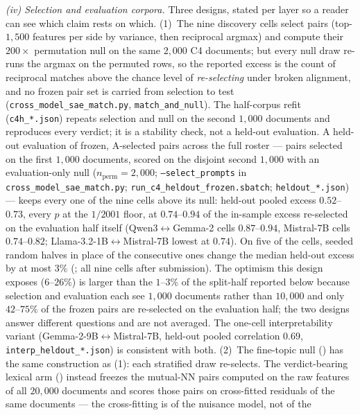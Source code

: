 \emph{(iv) Selection and evaluation corpora.} Three designs, stated per layer so a reader
can see which claim rests on which. (1)~The nine discovery cells select pairs (top-$1{,}500$
features per side by variance, then reciprocal argmax) and compute their $200\times$
permutation null on the same $2{,}000$ C4 documents; but every null draw re-runs the argmax
on the permuted rows, so the reported excess is the count of reciprocal matches above the
chance level of \emph{re-selecting} under broken alignment, and no frozen pair set is
carried from selection to test (\texttt{cross\_model\_sae\_match.py},
\texttt{match\_and\_null}). The half-corpus refit (\texttt{c4h\_*.json}) repeats selection
and null on the second $1{,}000$ documents and reproduces every verdict; it is a stability
check, not a held-out evaluation. A held-out evaluation of frozen, A-selected pairs across
the full roster --- pairs selected on the first $1{,}000$ documents, scored on the disjoint
second $1{,}000$ with an evaluation-only null ($n_{\text{perm}}{=}2{,}000$;
\texttt{--select\_prompts} in \texttt{cross\_model\_sae\_match.py};
\texttt{run\_c4\_heldout\_frozen.sbatch}; \texttt{heldout\_*.json}) --- keeps every one of
the nine cells above its null: held-out pooled excess $0.52$--$0.73$, every $p$ at the
$1/2001$ floor, at $0.74$--$0.94$ of the in-sample excess re-selected on the evaluation
half itself (Qwen3$\leftrightarrow$Gemma-2 cells $0.87$--$0.94$, Mistral-7B cells
$0.74$--$0.82$; Llama-3.2-1B$\leftrightarrow$Mistral-7B lowest at $0.74$). On five of the cells,
seeded random halves in place of the consecutive ones change the median held-out excess by at most $3\%$
(; all nine cells after submission). The optimism
this design exposes ($6$--$26\%$) is larger than the $1$--$3\%$ of the split-half reported
below because selection and evaluation each see $1{,}000$ documents rather than
$10{,}000$ and only $42$--$75\%$ of the frozen pairs are re-selected on the evaluation
half; the two designs answer different questions and are not averaged. The one-cell
interpretability variant (Gemma-2-9B$\leftrightarrow$Mistral-7B, held-out pooled correlation
$0.69$, \texttt{interp\_heldout\_*.json}) is consistent with both. (2)~The fine-topic null
() has the same construction as (1): each stratified draw re-selects. The
verdict-bearing lexical arm () instead freezes the mutual-NN pairs computed
on the raw features of all $20{,}000$ documents and scores those pairs on cross-fitted
residuals of the same documents --- the cross-fitting is of the nuisance model, not of the

